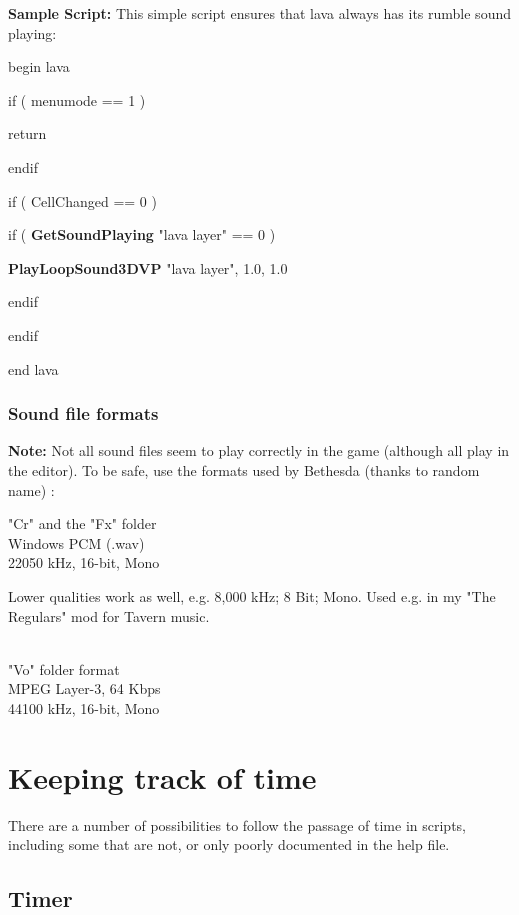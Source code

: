 \documentclass[
]{article}
\begin{document}
\textbf{Sample Script:} This simple script ensures that lava always has
its rumble sound playing:

begin lava

if ( menumode == 1 )

return

endif

if ( CellChanged == 0 )

if ( \textbf{GetSoundPlaying} "lava layer" == 0 )

\textbf{PlayLoopSound3DVP} "lava layer", 1.0, 1.0

endif

endif

end lava

\hypertarget{sound-file-formats}{%
\subsubsection{Sound file formats}\label{sound-file-formats}}

\textbf{Note:} Not all sound files seem to play correctly in the game
(although all play in the editor). To be safe, use the formats used by
Bethesda (thanks to random name) :

"Cr" and the "Fx" folder\\
Windows PCM (.wav)\\
22050 kHz, 16-bit, Mono

Lower qualities work as well, e.g. 8,000 kHz; 8 Bit; Mono. Used e.g. in
my "The Regulars" mod for Tavern music.\\
\strut \\
"Vo" folder format\\
MPEG Layer-3, 64 Kbps\\
44100 kHz, 16-bit, Mono

\hypertarget{keeping-track-of-time}{%
\section{\texorpdfstring{\hfill\break
Keeping track of
time}{ Keeping track of time}}\label{keeping-track-of-time}}

There are a number of possibilities to follow the passage of time in
scripts, including some that are not, or only poorly documented in the
help file.

\hypertarget{timer}{%
\subsection{Timer}\label{timer}}
\end{document}
